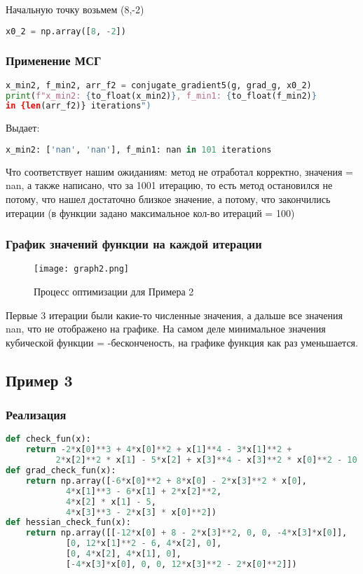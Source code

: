 \documentclass{article}
\begin{document}
Начальную точку возьмем (8,-2)

\begin{lstlisting}[language=Python]
x0_2 = np.array([8, -2])
\end{lstlisting}

\newpage
\subsubsection{Применение МСГ}
\begin{lstlisting}[language=Python]
x_min2, f_min2, arr_f2 = conjugate_gradient5(g, grad_g, x0_2)
print(f"x_min2: {to_float(x_min2)}, f_min1: {to_float(f_min2)}
in {len(arr_f2)} iterations")
\end{lstlisting}

Выдает:
\begin{lstlisting}[language=Python]
x_min2: ['nan', 'nan'], f_min1: nan in 101 iterations
\end{lstlisting}

Что соответствует нашим ожиданиям: метод не отработал корректно, значения = nan, а также написано, что за 1001 итерацию, то есть метод остановился не потому, что нашел достаточно близкое значение, а потому, что закончились итерации (в функции задано максимальное кол-во итераций = 100)

\subsubsection{График значений функции на каждой итерации}
\begin{figure}[H]
    \centering
    \texttt{[image: graph2.png]}
    \caption{Процесс оптимизации для Примера 2}
\end{figure}
Первые 3 итерации были какие-то численные значения, а дальше все значения nan, что не отображено на графике. На самом деле минимальное значения кубической функции = -бесконченость, на графике функция как раз уменьшается.

\newpage
\subsection{Пример 3}

\subsubsection{Реализация}
\begin{lstlisting}[language=Python]
def check_fun(x):
    return -2*x[0]**3 + 4*x[0]**2 + x[1]**4 - 3*x[1]**2 +
    	  2*x[2]**2 * x[1] - 5*x[2] + x[3]**4 - x[3]**2 * x[0]**2 - 10
def grad_check_fun(x):
    return np.array([-6*x[0]**2 + 8*x[0] - 2*x[3]**2 * x[0],
            4*x[1]**3 - 6*x[1] + 2*x[2]**2,
            4*x[2] * x[1] - 5,
            4*x[3]**3 - 2*x[3] * x[0]**2])
def hessian_check_fun(x):
    return np.array([[-12*x[0] + 8 - 2*x[3]**2, 0, 0, -4*x[3]*x[0]],
            [0, 12*x[1]**2 - 6, 4*x[2], 0],
            [0, 4*x[2], 4*x[1], 0],
            [-4*x[3]*x[0], 0, 0, 12*x[3]**2 - 2*x[0]**2]])
\end{lstlisting}
\end{document}
